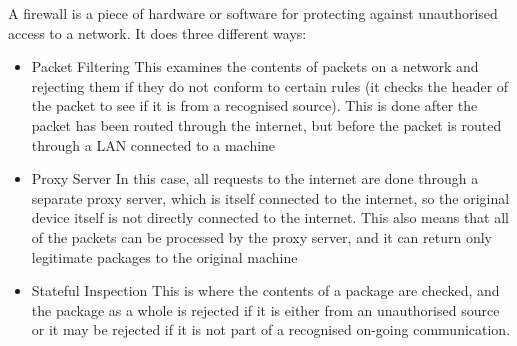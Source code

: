   \noindent
  A firewall is a piece of hardware or software for protecting against unauthorised access to a network. It does three different ways:
  \begin{itemize}
  	\item Packet Filtering
	  	\subitem This examines the contents of packets on a network and rejecting them if they do not conform to certain rules (it checks the header of the packet to see if it is from a recognised source). This is done after the packet has been routed through the internet, but before the packet is routed through a LAN connected to a machine
  	\item Proxy Server
	  	\subitem In this case, all requests to the internet are done through a separate proxy server, which is itself connected to the internet, so the original device itself is not directly connected to the internet. This also means that all of the packets can be processed by the proxy server, and it can return only legitimate packages to the original machine
  	\item Stateful Inspection
	  	\subitem This is where the contents of a package are checked, and the package as a whole is rejected if it is either from an unauthorised source or it may be rejected if it is not part of a recognised on-going communication.
  \end{itemize}
  
